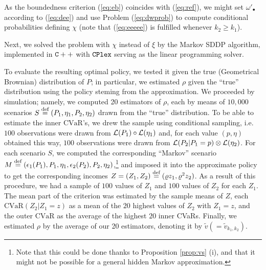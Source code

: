 \documentclass{article}              %
\begin{document}
As the boundedness criterion (\ref{eq:eb}) coincides
with (\ref{eq:ref}), we might set $\omega'_{\bullet}$ according
to (\ref{eq:dee}) and use Problem (\ref{eq:dwprob}) to compute conditional
probabilities defining $\chi$ (note that (\ref{eq:eeeee}) is fulfilled
whenever $k_{2}\geq k_{1}$).

\def\CVaR{\mathrm{CVaR}}

Next, we solved the problem with $\chi$ instead of $\xi$ by the Markov SDDP
algorithm, implemented in ${\tt C++}$ with ${\tt CPlex}$ serving as the
linear programming solver. 

To evaluate the resulting optimal policy, we tested it given the true (Geometrical
Brownian) distribution of $P$; in particular, we estimated $\rho$ given the ``true'' distribution  using the policy steming from the approximation. We proceeded by simulation; namely, we 
computed 20 estimators of $\rho$, each by means of $10,000$ scenarios $S\stackrel{\text{\rm def}}{=}(P_{1},\eta_{1},P_{2},\eta_{2})$ drawn from the ``true'' distribution. To be able to estimate the inner $\CVaR$'s, we drew the sample using conditional sampling, i.e. $100$ observations were drawn from $\mathcal{L}(P_1)\circ\mathcal{L}(\eta_1)$ and, for each value $(p,\eta)$ obtained this way, $100$ observations were drawn from $\mathcal{L}(P_2|P_1=p)\otimes\mathcal{L}(\eta_2)$. For each scenario $S$, we computed the corresponding ``Markov'' scenario $M\stackrel{\text{\rm def}}{=} (\epsilon_{1}(P_{1}),P_{1},\eta_{1},\epsilon_{2}(P_{2}),P_{2},\eta_{2})$,\footnote{Note that this could be done thanks to Proposition \ref{prop:vs} (i), and that it might not be possible for a general hidden Markov approximation.} and imposed it into the approximate policy to get the corresponding incomes $Z=(Z_1,Z_2)\stackrel{\text{\rm def}}{=} (\varrho z_1, \varrho^2 z_2)$. As a result of this procedure, we had a sample of $100$ values of $Z_1$ and $100$ values of $Z_2$ for each $Z_1$. The mean part of the criterion was estimated by the sample means of $Z$, each $\CVaR(Z_2|Z_1=z)$ as a mean of the $20$ highest values of $Z_2$ with $Z_1=z$, and the outer $\CVaR$ as the average of the highest $20$ inner CVaRs. Finally, we estimated $\rho$ by the average of our 20 estimators, denoting it by $\tilde v(=\tilde v_{k_1,k_2})$.
\end{document}
